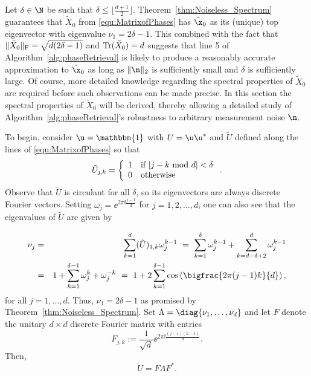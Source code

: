 Let $\delta \in \N$ be such that $\delta \le \lfloor \frac{d+1}{2} \rfloor$.  Theorem~\ref{thm:Noiseless_Spectrum} guarantees that $\tilde{X}_0$ from \eqref{equ:MatrixofPhases} has $\tilde{\x}_0$ as its (unique) top eigenvector with eigenvalue $\nu_1 = 2 \delta -1$.  This combined with the fact that $\| \tilde{X}_0 \|_{\rm F} = \sqrt{d (2 \delta - 1)}$ and ${\rm Tr}(\tilde{X}_0) = d$ suggests that line 5 of Algorithm~\ref{alg:phaseRetrieval} is likely to produce a reasonably accurate approximation to $\tilde{\x}_0$ as long as $\| \n \|_2$ is sufficiently small and $\delta$ is sufficiently large.  Of course, more detailed knowledge regarding the spectral properties of $\tilde{X}_0$ are required before such observations can be made precise.  In this section the spectral properties of $\tilde{X}_0$ will be derived, thereby allowing a detailed study of Algorithm~\ref{alg:phaseRetrieval}'s robustness to arbitrary measurement noise $\n$.

To begin, consider $\u = \mathbbm{1}$ with $U = \u\u^*$ and $\tilde{U}$ defined along the lines of \eqref{equ:MatrixofPhases} so that
\begin{equation}
\tilde{U}_{j,k} =  \left\{ \begin{array}{ll} 1 & \textrm{if}~| j - k ~{\rm mod}~d | < \delta \\ 0 & \textrm{otherwise} \end{array} \right..
\label{equ:NormedUmatSPG}
\end{equation}
Observe that $\tilde{U}$ is circulant for all $\delta$, so its eigenvectors are always discrete Fourier vectors.  Setting $\omega_j = \ee^{2\pi\ii\frac{j-1}{d}}$ for $j = 1, 2, \ldots, d$, one can also see that the eigenvalues of $\tilde{U}$ are given by 

\begin{eqnarray}
\nu_j & = & \sum_{k = 1}^d (\tilde{U})_{1,k}\omega_j^{k-1} ~=~  \sum_{k = 1}^\delta \omega_j^{k-1} + \sum_{k=d-\delta + 2}^d \omega_j^{k-1} \notag \\
& = & 1 + \sum_{k = 1}^{\delta - 1}\omega_j^k + \omega_j^{-k} ~=~ 1 + 2 \sum_{k = 1}^{\delta - 1}\cos\left(\bigfrac{2\pi (j-1) k}{d}\right),
\label{eqn:lambda}
\end{eqnarray}
for all $j = 1, \dots, d$.  Thus, $\nu_1 = 2 \delta - 1$ as promised by Theorem~\ref{thm:Noiseless_Spectrum}.  Set $\Lambda = \diag\{\nu_1, \ldots, \nu_{d}\}$ and let $F$ denote the unitary $d \times d$ discrete Fourier matrix with entries 
$$F_{j,k} := \frac{1}{\sqrt{d}} \ee^{2\pi\ii\frac{(j-1)(k-1)}{d}}.$$ 
Then, \begin{equation}\tilde{U} = F \Lambda F^*\label{eq:Utilde}.\end{equation}

